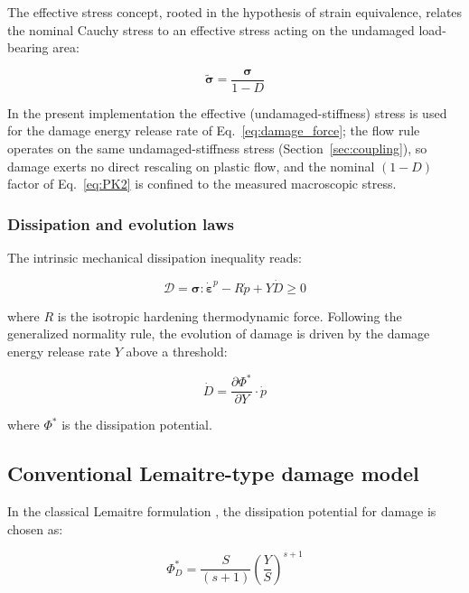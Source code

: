The effective stress concept, rooted in the hypothesis of strain equivalence, relates the nominal Cauchy stress to an effective stress acting on the undamaged load-bearing area:

\begin{equation}
\tilde{\boldsymbol{\sigma}} = \frac{\boldsymbol{\sigma}}{1-D}
\label{eq:effective_stress}
\end{equation}

In the present implementation the effective (undamaged-stiffness) stress is used for the damage energy release rate of Eq.~\eqref{eq:damage_force}; the flow rule operates on the same undamaged-stiffness stress (Section~\ref{sec:coupling}), so damage exerts no direct rescaling on plastic flow, and the nominal $(1-D)$ factor of Eq.~\eqref{eq:PK2} is confined to the measured macroscopic stress.

\subsubsection{Dissipation and evolution laws}

The intrinsic mechanical dissipation inequality reads:

\begin{equation}
\mathcal{D} = \boldsymbol{\sigma} : \dot{\boldsymbol{\varepsilon}}^p - R\dot{p} + Y\dot{D} \ge 0
\label{eq:dissipation}
\end{equation}

where $R$ is the isotropic hardening thermodynamic force. Following the generalized normality rule, the evolution of damage is driven by the damage energy release rate $Y$ above a threshold:

\begin{equation}
\dot{D} = \frac{\partial \Phi^*}{\partial Y} \cdot \dot{p}
\label{eq:damage_evolution_general}
\end{equation}

where $\Phi^*$ is the dissipation potential.

\subsection{Conventional Lemaitre-type damage model}

In the classical Lemaitre formulation \cite{lemaitre1985continuous,dufailly1995vlcf}, the dissipation potential for damage is chosen as:

\begin{equation}
\Phi^*_D = \frac{S}{(s+1)}\left(\frac{Y}{S}\right)^{s+1}
\label{eq:lemaitre_potential}
\end{equation}

